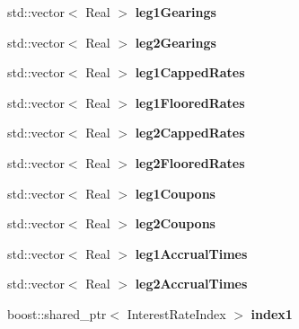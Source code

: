 \begin{DoxyCompactItemize}
\item 
std\+::vector$<$ Real $>$ {\bfseries leg1\+Gearings}\label{class_quant_lib_1_1_float_float_swap_1_1arguments_ac62df6e251f836388562d755118f3c61}

\item 
std\+::vector$<$ Real $>$ {\bfseries leg2\+Gearings}\label{class_quant_lib_1_1_float_float_swap_1_1arguments_a246091c0a8983108ac4aadfafbe121c3}

\item 
std\+::vector$<$ Real $>$ {\bfseries leg1\+Capped\+Rates}\label{class_quant_lib_1_1_float_float_swap_1_1arguments_a072a9e8e8dba3dc4cbc40a27af6c69bd}

\item 
std\+::vector$<$ Real $>$ {\bfseries leg1\+Floored\+Rates}\label{class_quant_lib_1_1_float_float_swap_1_1arguments_ae72063e59a347e0747c6b644f906a100}

\item 
std\+::vector$<$ Real $>$ {\bfseries leg2\+Capped\+Rates}\label{class_quant_lib_1_1_float_float_swap_1_1arguments_a00374c1857aa5ab7a1fbb4d9f51ef30a}

\item 
std\+::vector$<$ Real $>$ {\bfseries leg2\+Floored\+Rates}\label{class_quant_lib_1_1_float_float_swap_1_1arguments_a5b4dfa13d708779baa3f5e33be86e065}

\item 
std\+::vector$<$ Real $>$ {\bfseries leg1\+Coupons}\label{class_quant_lib_1_1_float_float_swap_1_1arguments_ad7b52dc490848f1cd706549034310b98}

\item 
std\+::vector$<$ Real $>$ {\bfseries leg2\+Coupons}\label{class_quant_lib_1_1_float_float_swap_1_1arguments_a67db05665be67f7b1f61018844e2aeab}

\item 
std\+::vector$<$ Real $>$ {\bfseries leg1\+Accrual\+Times}\label{class_quant_lib_1_1_float_float_swap_1_1arguments_aa9bf2315dfa5d874c69b64e1428e3d79}

\item 
std\+::vector$<$ Real $>$ {\bfseries leg2\+Accrual\+Times}\label{class_quant_lib_1_1_float_float_swap_1_1arguments_a62477bbf0ff489d1a7ac4392607b4f8a}

\item 
boost\+::shared\+\_\+ptr$<$ Interest\+Rate\+Index $>$ {\bfseries index1}\label{class_quant_lib_1_1_float_float_swap_1_1arguments_a358ed9828be6111dd0b2f4b5a3e3a6c2}


\end{DoxyCompactItemize}
